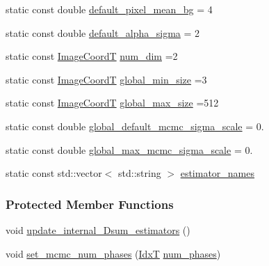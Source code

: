 \begin{DoxyCompactItemize}
static const double \hyperlink{classmappel_1_1PointEmitterModel_abe82d75be8586234657a61e2f137a6c8}{default\+\_\+pixel\+\_\+mean\+\_\+bg} = 4
\item 
static const double \hyperlink{classmappel_1_1PointEmitterModel_a0d9f2c5438940f329e75708987e8b343}{default\+\_\+alpha\+\_\+sigma} = 2
\item 
static const \hyperlink{classmappel_1_1ImageFormat2DBase_a45e9234d63c357f34ca56c72c12b9e9c}{Image\+CoordT} \hyperlink{classmappel_1_1ImageFormat2DBase_a9c29fcaf30faffc77b41ba556ebb0127}{num\+\_\+dim} =2
\item 
static const \hyperlink{classmappel_1_1ImageFormat2DBase_a45e9234d63c357f34ca56c72c12b9e9c}{Image\+CoordT} \hyperlink{classmappel_1_1ImageFormat2DBase_a1149e8545d3cfaa40c2f3bc02e3223b2}{global\+\_\+min\+\_\+size} =3
\item 
static const \hyperlink{classmappel_1_1ImageFormat2DBase_a45e9234d63c357f34ca56c72c12b9e9c}{Image\+CoordT} \hyperlink{classmappel_1_1ImageFormat2DBase_a11c9bb87930f597dff17e9923b73bf5e}{global\+\_\+max\+\_\+size} =512
\item 
static const double \hyperlink{classmappel_1_1MCMCAdaptorBase_a44cebca0e27135c854fa8430d2d89929}{global\+\_\+default\+\_\+mcmc\+\_\+sigma\+\_\+scale} = 0.
\item 
static const double \hyperlink{classmappel_1_1MCMCAdaptorBase_aebc93881ca351e67de867238a62579eb}{global\+\_\+max\+\_\+mcmc\+\_\+sigma\+\_\+scale} = 0.
\item 
static const std\+::vector$<$ std\+::string $>$ \hyperlink{classmappel_1_1PoissonNoise2DObjective_ac661699516dcee8b4e8a440e9b8b62d1}{estimator\+\_\+names}
\end{DoxyCompactItemize}
\subsubsection*{Protected Member Functions}
\begin{DoxyCompactItemize}
\item 
void \hyperlink{classmappel_1_1Gauss2DsModel_a6ce7054c0fcdb72394839a0abb2616cb}{update\+\_\+internal\+\_\+Dsum\+\_\+estimators} ()
\item 
void \hyperlink{classmappel_1_1MCMCAdaptorBase_ad6c75e327e8732abc2654492f372563a}{set\+\_\+mcmc\+\_\+num\+\_\+phases} (\hyperlink{namespacemappel_ab17ec0f30b61ece292439d7ece81d3a8}{IdxT} \hyperlink{classmappel_1_1MCMCAdaptorBase_a44b90a984ace712584074dc17831fe25}{num\+\_\+phases})
\end{DoxyCompactItemize}
